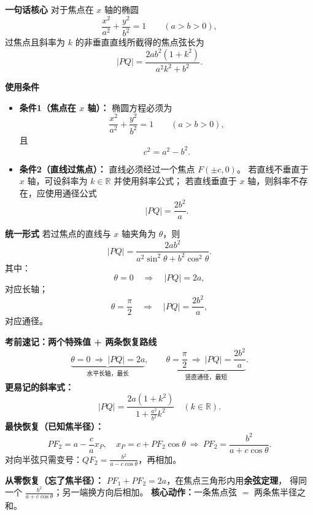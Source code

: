 \begin{summarybox}
	\textbf{\textcolor{CSummary}{一句话核心}}
	对于焦点在 $x$ 轴的椭圆
	\[
		\frac{x^2}{a^2}+\frac{y^2}{b^2}=1\qquad (a>b>0),
	\]
	过焦点且斜率为 $k$ 的非垂直直线所截得的焦点弦长为
	\[
		|PQ|=\frac{2ab^2(1+k^2)}{a^2k^2+b^2}.
	\]

	\medskip

	\textbf{\textcolor{CSummary}{使用条件}}

	\begin{itemize}[leftmargin=*, itemsep=0.5em, topsep=0.4em]
		\item \textbf{条件1（焦点在 $x$ 轴）：}
		      椭圆方程必须为
		      \[
			      \frac{x^2}{a^2}+\frac{y^2}{b^2}=1\qquad (a>b>0),
		      \]
		      且
		      \[
			      c^2=a^2-b^2.
		      \]

		\item \textbf{条件2（直线过焦点）：}
		      直线必须经过一个焦点 $F(\pm c,0)$。
		      若直线不垂直于 $x$ 轴，可设斜率为 $k\in\mathbb R$ 并使用斜率公式；
		      若直线垂直于 $x$ 轴，则斜率不存在，应使用通径公式
		      \[
			      |PQ|=\frac{2b^2}{a}.
		      \]
	\end{itemize}

	\medskip

	\textbf{\textcolor{CSummary}{统一形式}}
	若过焦点的直线与 $x$ 轴夹角为 $\theta$，则
	\[
		|PQ|=\frac{2ab^2}{a^2\sin^2\theta+b^2\cos^2\theta}.
	\]
	其中：
	\[
		\theta=0 \quad\Longrightarrow\quad |PQ|=2a,
	\]
	对应长轴；
	\[
		\theta=\frac{\pi}{2} \quad\Longrightarrow\quad |PQ|=\frac{2b^2}{a},
	\]
	对应通径。

	\medskip

	
    \textbf{\textcolor{CSummary}{考前速记：两个特殊值 + 两条恢复路线}}
    \[
        \underbrace{\theta=0\ \Longrightarrow\ |PQ|=2a}_{\text{水平长轴，最长}},\qquad
        \underbrace{\theta=\frac\pi2\ \Longrightarrow\ |PQ|=\frac{2b^2}{a}}_{\text{竖直通径，最短}}.
    \]
    \textbf{更易记的斜率式：}
    \[
        \boxed{|PQ|=\frac{2a(1+k^2)}{1+\frac{a^2}{b^2}k^2}}
        \quad(k\in\mathbb R).
    \]
    \textbf{最快恢复（已知焦半径）：}
    \[
        PF_2=a-\frac ca x_P,\quad x_P=c+PF_2\cos\theta
        \ \Longrightarrow\ PF_2=\frac{b^2}{a+c\cos\theta}.
    \]
    对向半弦只需变号：$QF_2=\frac{b^2}{a-c\cos\theta}$，再相加。

    \textbf{从零恢复（忘了焦半径）：}
    $PF_1+PF_2=2a$，在焦点三角形内用\textbf{余弦定理}，
    得同一个 $\frac{b^2}{a+c\cos\theta}$；另一端换方向后相加。
    \textbf{核心动作：}一条焦点弦 $=$ 两条焦半径之和。


\end{summarybox}

